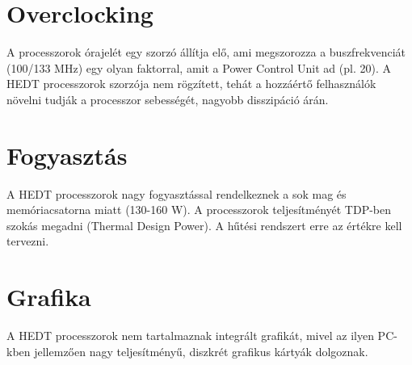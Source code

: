 \section{Overclocking}
A processzorok órajelét egy szorzó állítja elő, ami megszorozza a buszfrekvenciát (100/133 MHz) egy olyan faktorral, amit a Power Control Unit ad (pl. 20).
A HEDT processzorok szorzója nem rögzített, tehát a hozzáértő felhasználók növelni tudják a processzor sebességét, nagyobb disszipáció árán.

\section{Fogyasztás}
A HEDT processzorok nagy fogyasztással rendelkeznek a sok mag és memóriacsatorna miatt (130-160 W).
A processzorok teljesítményét TDP-ben szokás megadni (Thermal Design Power).
A hűtési rendszert erre az értékre kell tervezni.

\section{Grafika}
A HEDT processzorok nem tartalmaznak integrált grafikát, mivel az ilyen PC-kben jellemzően nagy teljesítményű, diszkrét grafikus kártyák dolgoznak.

